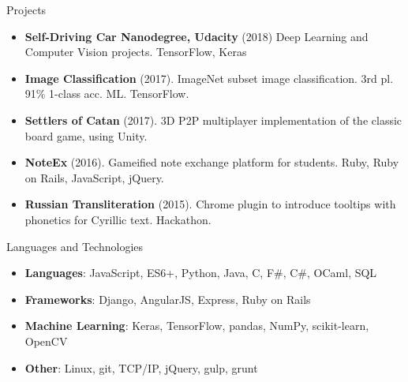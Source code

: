 \documentclass[]{muchicv}
\begin{document}
	\begin{cvsection}{Projects}
		\begin{cvsubsection}{}{}{}
			\begin{itemize}
				\item \textbf{Self-Driving Car Nanodegree, Udacity} (2018) Deep Learning and Computer Vision projects. TensorFlow, Keras
				\item \textbf{Image Classification} (2017). ImageNet subset image classification. 3rd pl. 91\% 1-class acc. ML. TensorFlow.
				\item \textbf{Settlers of Catan} (2017).  3D P2P multiplayer implementation of the classic board game, using Unity.
				\item \textbf{NoteEx} (2016). Gameified note exchange platform for students. Ruby, Ruby on Rails, JavaScript, jQuery.
				\item \textbf{Russian Transliteration} (2015). Chrome plugin to introduce tooltips with phonetics for Cyrillic text. Hackathon.
			\end{itemize}
		\end{cvsubsection}
	\end{cvsection}
	
	\begin{cvsection}{Languages and Technologies}
		\begin{cvsubsection}{}{}{}	
			\begin{itemize}
				\item \textbf{Languages}: JavaScript,  ES6+, Python, Java, C, F\#, C\#, OCaml, SQL 
				\item \textbf{Frameworks}: Django, AngularJS, Express, Ruby on Rails
				\item \textbf{Machine Learning}: Keras, TensorFlow, pandas, NumPy, scikit-learn, OpenCV
				\item \textbf{Other}: Linux, git, TCP/IP, jQuery, gulp, grunt
			\end{itemize}
		\end{cvsubsection}
	\end{cvsection}
	
\end{document}
